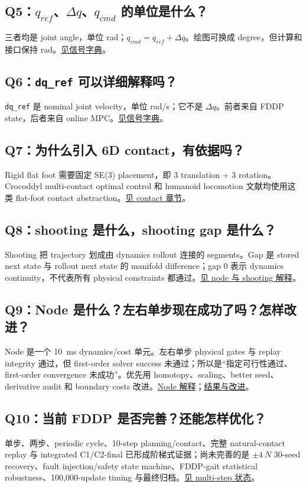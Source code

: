 \documentclass[UTF8,11pt,a4paper]{ctexart}
\newcommand{\code}[1]{\texttt{#1}}
\begin{document}
\subsection{Q5：$q_{ref}$、$\Delta q$、$q_{cmd}$ 的单位是什么？}\label{q5}
三者均是 joint angle，单位 rad；$q_{cmd}=q_{ref}+\Delta q$。绘图可换成 degree，但计算和接口保持 rad。\hyperref[sec:signals]{见信号字典}。

\subsection{Q6：\code{dq\_ref} 可以详细解释吗？}\label{q6}
\code{dq\_ref} 是 nominal joint velocity，单位 rad/s；它不是 $\Delta q$。前者来自 FDDP state，后者来自 online MPC。\hyperref[sec:signals]{见信号字典}。

\subsection{Q7：为什么引入 6D contact，有依据吗？}\label{q7}
Rigid flat foot 需要固定 SE(3) placement，即 3 translation + 3 rotation。Crocoddyl multi-contact optimal control 和 humanoid locomotion 文献均使用这类 flat-foot contact abstraction\cite{mastalli2020crocoddyl,kuindersma2016optimization}。\hyperref[sec:contact]{见 contact 章节}。

\subsection{Q8：shooting 是什么，shooting gap 是什么？}\label{q8}
Shooting 把 trajectory 划成由 dynamics rollout 连接的 segments。Gap 是 stored next state 与 rollout next state 的 manifold difference；gap 0 表示 dynamics continuity，不代表所有 physical constraints 都通过。\hyperref[sec:node]{见 node 与 shooting 解释}。

\subsection{Q9：Node 是什么？左右单步现在成功了吗？怎样改进？}\label{q9}
Node 是一个 \SI{10}{\milli\second} dynamics/cost 单元。左右单步 physical gates 与 replay integrity 通过，但 first-order solver success 未通过；所以是“指定可行性通过、first-order convergence 未成功”。优先用 homotopy、scaling、better seed、derivative audit 和 boundary costs 改进。\hyperref[sec:node]{Node 解释}；\hyperref[sec:weights_results]{结果与改进}。

\subsection{Q10：当前 FDDP 是否完善？还能怎样优化？}\label{q10}
单步、两步、periodic cycle、10-step planning/contact、完整 natural-contact replay 与 integrated C1/C2-final 已形成阶梯式证据；尚未完善的是 $\pm\SI{4}{N}$ 30-seed recovery、fault injection/safety state machine、FDDP-gait statistical robustness、100,000-update timing 与最终归档。\hyperref[sec:multistep]{见 multi-step 状态}。
\end{document}
